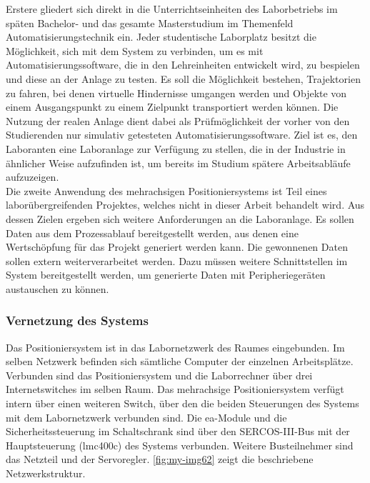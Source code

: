 \documentclass[../../../Bachelorarbeit.tex]{subfiles}
\begin{document}
Erstere gliedert sich direkt in die Unterrichtseinheiten des Laborbetriebs im späten Bachelor- und das gesamte Masterstudium im Themenfeld Automatisierungstechnik ein. Jeder studentische Laborplatz besitzt die Möglichkeit, sich mit dem System zu verbinden, um es mit Automatisierungssoftware, die in den Lehreinheiten entwickelt wird, zu bespielen und diese an der Anlage zu testen. Es soll die Möglichkeit bestehen, Trajektorien zu fahren, bei denen virtuelle Hindernisse umgangen werden und Objekte von einem Ausgangspunkt zu einem Zielpunkt transportiert werden können. Die Nutzung der realen Anlage dient dabei als Prüfmöglichkeit der vorher von den Studierenden nur simulativ getesteten Automatisierungssoftware. Ziel ist es, den Laboranten eine Laboranlage zur Verfügung zu stellen, die in der Industrie in ähnlicher Weise aufzufinden ist, um bereits im Studium spätere Arbeitsabläufe aufzuzeigen.\\
Die zweite Anwendung des mehrachsigen Positioniersystems ist Teil eines laborübergreifenden Projektes, welches nicht in dieser Arbeit behandelt wird. Aus dessen Zielen ergeben sich weitere Anforderungen an die Laboranlage. Es sollen Daten aus dem Prozessablauf bereitgestellt werden, aus denen eine Wertschöpfung für das Projekt generiert werden kann. Die gewonnenen Daten sollen extern weiterverarbeitet werden. Dazu müssen weitere Schnittstellen im System bereitgestellt werden, um generierte Daten mit Peripheriegeräten austauschen zu können.

\subsubsection{Vernetzung des Systems}
Das Positioniersystem ist in das Labornetzwerk des Raumes eingebunden. Im selben Netzwerk befinden sich sämtliche Computer der einzelnen Arbeitsplätze. Verbunden sind das Positioniersystem und die Laborrechner über drei Internetswitches im selben Raum. Das mehrachsige Positioniersystem verfügt intern über einen weiteren Switch, über den die beiden Steuerungen des Systems mit dem Labornetzwerk verbunden sind. Die \acs{ea}-Module und die Sicherheitssteuerung im Schaltschrank sind über den SERCOS-III-Bus mit der Hauptsteuerung (\acs{lmc}400c) des Systems verbunden. Weitere Busteilnehmer sind das Netzteil und der Servoregler. \autoref{fig:my-img62} zeigt die beschriebene Netzwerkstruktur.
\end{document}
